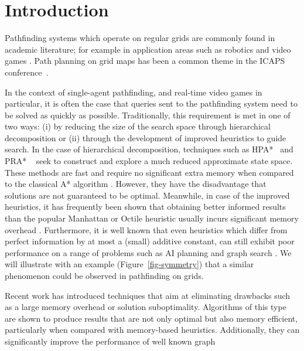 \section{Introduction}
Pathfinding systems which operate on regular grids are commonly found in
academic literature; for example in application areas such as robotics 
\cite{choset05} and video games \cite{botea04,sturtevant05,bjornsson06}.
Path planning on grid maps has been a common theme in the ICAPS 
conference~\cite{DBLP:conf/aips/ThayerR09,DBLP:conf/aips/HernandezMSK09,DBLP:conf/aips/WangB08,DBLP:conf/aips/BulitkoBLSS07}.
\par
In the context of single-agent pathfinding, and real-time video games in particular, 
it is often the case that queries sent to the pathfinding system  need to be solved as quickly as possible.
Traditionally, this requirement is met in one of two ways: (i) by reducing the size of the search space through hierarchical 
decomposition or (ii) through the development of improved heuristics to guide search.
In the case of hierarchical decomposition, techniques such as
HPA*~\cite{botea04} and PRA* ~\cite{sturtevant05} seek to construct and explore
a much reduced approximate state space.
These methods are fast and require no significant extra memory when compared to the classical
A* algorithm \cite{hart68}.
However, they have the disadvantage that solutions are not guaranteed to be optimal.
Meanwhile, in case of the improved heuristics, it has frequently been shown
that obtaining better informed results than the popular
Manhattan or Octile heuristic usually incurs significant memory overhead 
\cite{sturtevant09,goldberg05,Cazenave:06}. %
Furthermore, it is well known that even heuristics which differ from perfect information 
by at most a (small) additive constant, can still exhibit poor performance on a range of 
problems such as AI planning and graph search \cite{helmert08,pohl77}.
We will illustrate with an example (Figure~\ref{fig-symmetry})
that a similar phenomenon could be observed in pathfinding on grids.
\par
Recent work \cite{bjornsson06,pochter10,harabor10}
has introduced techniques that aim at eliminating drawbacks
such as a large memory overhead or solution suboptimality.
Algorithms of this type are shown to produce 
results that are not only optimal but also memory efficient, particularly when compared 
with memory-based heuristics.
Additionally, they can significantly improve the performance of well known graph
